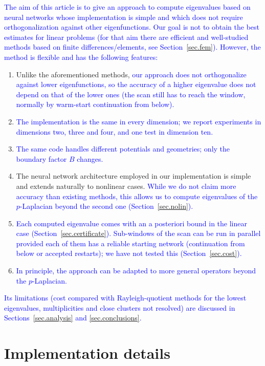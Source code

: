 \documentclass[10pt]{amsart}
\newcommand{\rev}[1]{\textcolor{blue}{#1}}
\theoremstyle{definition}
\theoremstyle{remark}
\theoremstyle{plain}
\begin{document}
\rev{The aim of this article is to give an approach to compute eigenvalues based on neural networks
whose implementation is simple and which does not require orthogonalization against other eigenfunctions.
Our goal is not to obtain the best estimates for linear problems (for that aim there are efficient
and well-studied methods based on finite differences/elements, see Section~\ref{sec.fem}). However,
the method is flexible and has the following features:}
\begin{enumerate}
\item  Unlike the aforementioned methods, \rev{our approach does not orthogonalize against lower eigenfunctions, so the accuracy of a higher eigenvalue does not depend on that of the lower ones (the scan still has to reach the window, normally by warm-start continuation from below).}

\item \rev{The implementation is the same in every dimension; we report experiments in dimensions two, three and four, and one test in dimension ten.}

\item \rev{The same code handles different potentials and geometries; only the boundary factor $B$ changes.}

\item The neural network architecture employed in our implementation is simple and extends naturally to nonlinear cases. \rev{While we do not claim more accuracy than existing methods, this allows us to compute eigenvalues of the $p$-Laplacian beyond the second one (Section~\ref{sec.nolin}).}

\item \rev{Each computed eigenvalue comes with an a posteriori bound in the linear case (Section~\ref{sec.certificate}). Sub-windows of the scan can be run in parallel provided each of them has a reliable starting network (continuation from below or accepted restarts); we have not tested this (Section~\ref{sec.cost}).}

\item \rev{In principle, the approach can be adapted to more general operators beyond the $p$-Laplacian.}
\end{enumerate}
\rev{Its limitations (cost compared with Rayleigh-quotient methods for the lowest eigenvalues,
multiplicities and close clusters not resolved) are discussed in Sections~\ref{sec.analysis} and
\ref{sec.conclusions}.}


\section{Implementation details}\label{sec.implementation}
\end{document}
